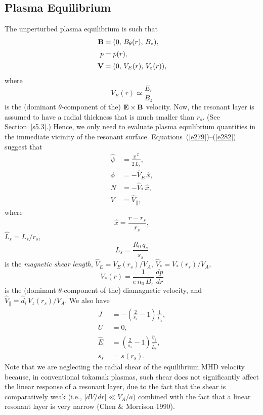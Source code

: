 \documentclass[notitlepage,12pt]{article}
\begin{document}
\subsection{Plasma Equilibrium}
The unperturbed plasma equilibrium is such that
\begin{align}
{\bf B} &= (0,\,B_\theta(r),\,B_z),\\[0.5ex]
p &= p(r),\\[0.5ex]
{\bf V} &= (0,\,V_E(r),\,V_z(r)),\label{e282}
\end{align}
where 
\begin{equation}
V_E(r)\simeq \frac{E_r}{B_z}
\end{equation}
 is the (dominant $\theta$-component of the) ${\bf E}\times {\bf B}$ velocity. Now, the resonant layer is assumed to have a radial thickness that is
much smaller than $r_s$. (See Section~\ref{s5.3}.) Hence, we only need to evaluate plasma equilibrium quantities in the immediate vicinity of the resonant
surface. Equations~(\ref{e279})--(\ref{e282}) suggest that 
\begin{align}\label{e287}
\hat{\psi} &= \frac{\hat{x}^{\,2}}{2\,\hat{L}_s},\\[0.5ex]
\phi &= - \hat{V}_E\,\hat{x},\\[0.5ex]
N &= -\hat{V}_\ast\,\hat{x},\\[0.5ex]
V &= \hat{V}_\parallel,\label{e290}
\end{align}
where 
\begin{equation}
\hat{x}=\frac{r-r_s}{r_s},
\end{equation}
 $\hat{L}_s=L_s/r_s$, 
 \begin{equation}
 L_s=\frac{R_0\,q_s}{s_s}
 \end{equation}
  is the {\em magnetic shear length},  $\hat{V}_E= V_E(r_s)/V_A$,
$\hat{V}_\ast= V_\ast(r_s)/V_A$,
\begin{equation}
V_\ast(r) = \frac{1}{e\,n_0\,B_z}\,\frac{dp}{dr}
\end{equation}
is the (dominant $\theta$-component of the) diamagnetic velocity,
  and 
 $\hat{V}_\parallel=\hat{d}_i\, V_z(r_s)/V_A$. We also have
 \begin{align}\label{e292}
 J &= -\left(\frac{2}{s_s}-1\right)\frac{1}{\hat{L}_s},\\[0.5ex]
 U &= 0,\label{e293}\\[0.5ex]
 \hat{E}_\parallel &=\left(\frac{2}{s_s}-1\right) \frac{\hat{\eta}_\parallel}{\hat{L}_s},\label{e294}\\[0.5ex]
s_s&=s(r_s).
\end{align} 
Note that we are neglecting the radial shear of the equilibrium MHD velocity because, in conventional tokamak plasmas, such shear does not significantly affect the linear response of a  resonant
layer, due to the fact that the shear is comparatively weak (i.e., $|dV/dr|\ll V_A/a$) combined with the fact that a linear  resonant layer is
very narrow (Chen \& Morrison 1990). 
\end{document}
